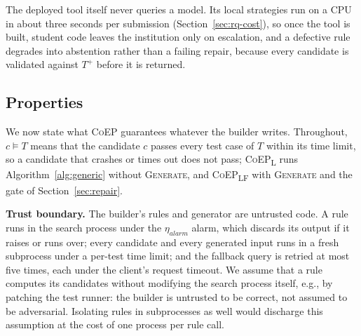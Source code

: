 \documentclass[acmsmall,screen,review,anonymous,nonacm]{acmart}
\newcommand{\tool}{\textsc{CoEP}\xspace}
\newcommand{\coepL}{\textsc{CoEP}\textsubscript{L}\xspace}
\newcommand{\coepLF}{\textsc{CoEP}\textsubscript{LF}\xspace}
\newcommand{\Fn}[1]{\textsc{#1}}
\newcommand{\V}[1]{\ensuremath{\mathit{#1}}}
\begin{document}
The deployed tool itself never queries a model. Its local strategies run on a CPU in about three seconds per submission (Section~\ref{sec:rq-cost}), so once the tool is built, student code leaves the institution only on escalation, and a defective rule degrades into abstention rather than a failing repair, because every candidate is validated against $T^{+}$ before it is returned.

\subsection{Properties}
\label{sec:props}

We now state what \tool guarantees whatever the builder writes. Throughout, $c \models T$ means that the candidate $c$ passes every test case of $T$ within its time limit, so a candidate that crashes or times out does not pass; \coepL runs Algorithm~\ref{alg:generic} without \Fn{Generate}, and \coepLF with \Fn{Generate} and the gate of Section~\ref{sec:repair}.

\textbf{Trust boundary.} The builder's rules and generator are untrusted code. A rule runs in the search process under the $\eta_{\V{alarm}}$ alarm, which discards its output if it raises or runs over; every candidate and every generated input runs in a fresh subprocess under a per-test time limit; and the fallback query is retried at most five times, each under the client's request timeout. We assume that a rule computes its candidates without modifying the search process itself, e.g., by patching the test runner: the builder is untrusted to be correct, not assumed to be adversarial. Isolating rules in subprocesses as well would discharge this assumption at the cost of one process per rule call.
\end{document}
